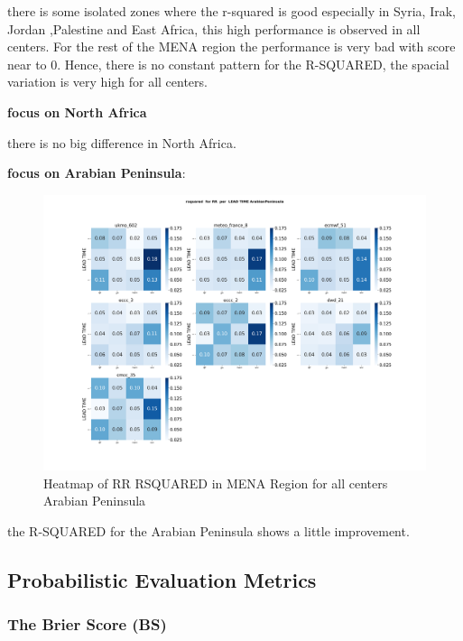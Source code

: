 there is some isolated zones where the r-squared is good especially in Syria, Irak, Jordan ,Palestine  and East Africa, this high performance is observed in all centers. For the rest of the MENA region the performance is very bad with score near to 0. Hence, there is no constant pattern for the R-SQUARED, the spacial variation is very high for all centers.

\vspace{1.5cm}
\textbf{focus on North Africa}

there is no big difference in North Africa.


\vspace{1.5cm}
\textbf{focus on Arabian Peninsula}:


\begin{figure}[H]
\includegraphics[scale=0.3]{plots/det/rsquared/rsquared_RR_ArabianPeninsula.png}
\caption{Heatmap of RR  RSQUARED in MENA Region for all centers Arabian Peninsula}
\end{figure}

the R-SQUARED for the Arabian Peninsula shows a little improvement.


\subsection{Probabilistic Evaluation Metrics}

\subsubsection{The Brier Score (BS)}

